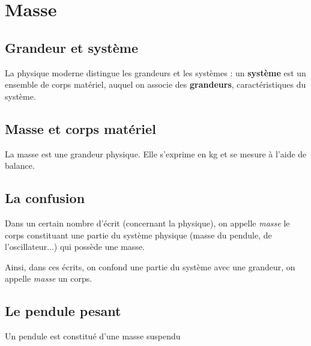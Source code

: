 \section{Masse}

\subsection{Grandeur et système}
La physique moderne distingue les grandeurs et les systèmes : un {\bf système} est un ensemble de corps matériel, auquel on associe des {\bf grandeurs}, caractéristiques du système.

\subsection{Masse et corps matériel}
La masse est une grandeur physique. Elle s'exprime en kg et se mesure à l'aide de balance. 

\subsection{La confusion}
Dans un certain nombre d'écrit (concernant la physique), on appelle {\it masse} le corps constituant une partie du système physique (masse du pendule, de l'oscillateur...) qui possède une masse.

Ainsi, dans ces écrits, on confond une partie du système avec une grandeur, on appelle {\it masse} un corps.

\subsection{Le pendule pesant}
Un pendule est constitué d'une masse suspendu

